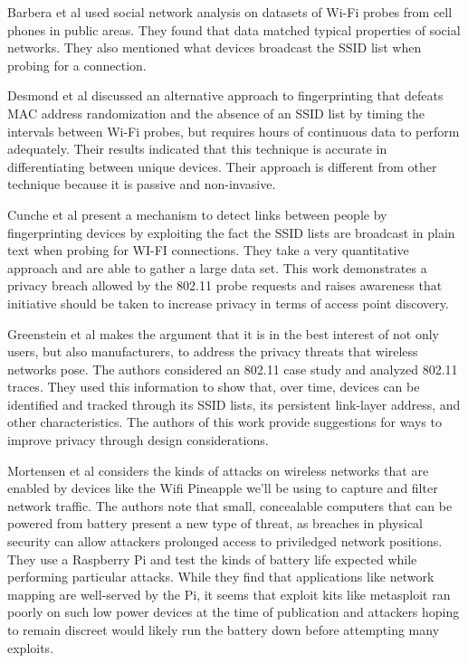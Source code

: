 \documentclass[letterpaper,twocolumn,10pt]{article}
\begin{document}
Barbera et al \cite{barbera} used social network analysis on datasets of Wi-Fi probes from cell phones in public areas. They found that data matched typical properties of social networks. They also mentioned what devices broadcast the SSID list when probing for a connection.

Desmond et al \cite{desmond} discussed an alternative approach to fingerprinting that defeats MAC address randomization and the absence of an SSID list by timing the intervals between Wi-Fi probes, but requires hours of continuous data to perform adequately. Their results indicated that this technique is accurate in differentiating between unique devices. Their approach is different from other technique because it is passive and non-invasive.

Cunche et al \cite{cunche}  present a mechanism to detect links between people by fingerprinting devices by exploiting the fact the SSID lists are broadcast in plain text when probing for WI-FI connections. They take a very quantitative approach and are able to gather a large data set. This work demonstrates a privacy breach allowed by the 802.11 probe requests and raises awareness that initiative should be taken to increase privacy in terms of access point discovery. 

Greenstein et al \cite{greenstein} makes the argument that it is in the best interest of not only users, but also manufacturers, to address the privacy threats that wireless networks pose. The authors considered an 802.11 case study and analyzed 802.11 traces. They used this information to show that, over time, devices can be identified and tracked through its SSID lists, its persistent link-layer address, and other characteristics. The authors of this work provide suggestions for ways to improve privacy through design considerations.

Mortensen et al \cite{mortensen} considers the kinds of attacks on wireless networks that are enabled by devices like the Wifi Pineapple we’ll be using to capture and filter network traffic. The authors note that small, concealable computers that can be powered from battery present a new type of threat, as breaches in physical security can allow attackers prolonged access to priviledged network positions. They use a Raspberry Pi and test the kinds of battery life expected while performing particular attacks. While they find that applications like network mapping are well-served by the Pi, it seems that exploit kits like metasploit ran poorly on such low power devices at the time of publication and attackers hoping to remain discreet would likely run the battery down before attempting many exploits.
\end{document}
